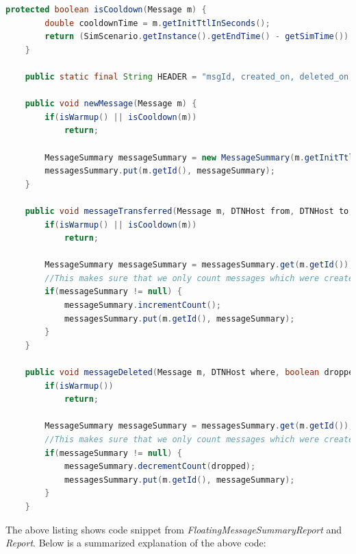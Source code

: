 \begin{lstlisting}[language=java]
	protected boolean isCooldown(Message m) {
		double cooldownTime = m.getInitTtlInSeconds();
		return (SimScenario.getInstance().getEndTime() - getSimTime()) <= cooldownTime ;
	}

	public static final String HEADER = "msgId, created_on, deleted_on, ttl, life, totalCopies, dropped";

	public void newMessage(Message m) {
		if(isWarmup() || isCooldown(m))
			return;

		MessageSummary messageSummary = new MessageSummary(m.getInitTtlInSeconds());
	    messagesSummary.put(m.getId(), messageSummary);
	}

	public void messageTransferred(Message m, DTNHost from, DTNHost to, boolean firstDelivery) {
		if(isWarmup() || isCooldown(m))
			return;

		MessageSummary messageSummary = messagesSummary.get(m.getId());
		//This makes sure that we only count messages which were created before cooldown
		if(messageSummary != null) {
			messageSummary.incrementCount();
			messagesSummary.put(m.getId(), messageSummary);
		}
	}

	public void messageDeleted(Message m, DTNHost where, boolean dropped) {
		if(isWarmup())
			return;

		MessageSummary messageSummary = messagesSummary.get(m.getId());
		//This makes sure that we only count messages which were created before cooldown
		if(messageSummary != null) {
			messageSummary.decrementCount(dropped);
			messagesSummary.put(m.getId(), messageSummary);
		}
	}
\end{lstlisting}
\vspace{5mm}
The above listing shows code snippet from \textit{FloatingMessageSummaryReport} and \textit{Report}. Below is a summarized explanation of the above code:
